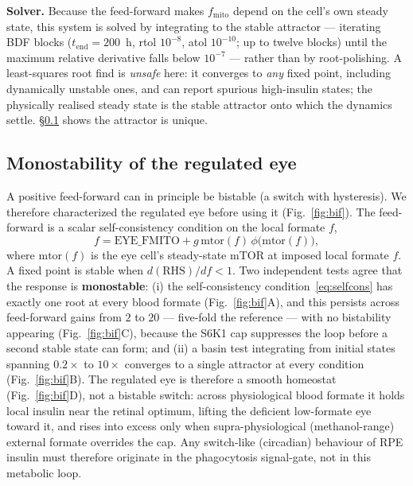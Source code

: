 \documentclass[11pt]{article}
\begin{document}
\textbf{Solver.} Because the feed-forward makes $f_{\mathrm{mito}}$ depend on the
cell's own steady state, this system is solved by integrating to the stable
attractor --- iterating BDF blocks ($t_{\mathrm{end}}=200$~h, rtol $10^{-8}$, atol
$10^{-10}$; up to twelve blocks) until the maximum relative derivative falls below
$10^{-7}$ --- rather than by root-polishing. A least-squares root find is
\emph{unsafe} here: it converges to \emph{any} fixed point, including dynamically
unstable ones, and can report spurious high-insulin states; the physically
realised steady state is the stable attractor onto which the dynamics settle.
\S\ref{sec:bif} shows the attractor is unique.

\subsection{Monostability of the regulated eye}\label{sec:bif}
A positive feed-forward can in principle be bistable (a switch with hysteresis).
We therefore characterized the regulated eye before using it
(Fig.~\ref{fig:bif}). The feed-forward is a scalar self-consistency condition on
the local formate $f$,
\begin{equation}
f=\mathrm{EYE\_FMITO}+g\,\mathrm{mtor}(f)\,\phi\!\big(\mathrm{mtor}(f)\big),
\label{eq:selfcons}
\end{equation}
where $\mathrm{mtor}(f)$ is the eye cell's steady-state mTOR at imposed local
formate $f$. A fixed point is stable when $d(\text{RHS})/df<1$. Two independent
tests agree that the response is \textbf{monostable}: (i) the self-consistency
condition~\eqref{eq:selfcons} has exactly one root at every blood formate
(Fig.~\ref{fig:bif}A), and this persists across feed-forward gains from $2$ to $20$
--- five-fold the reference --- with no bistability appearing (Fig.~\ref{fig:bif}C),
because the S6K1 cap suppresses the loop before a second stable state can form; and
(ii) a basin test integrating from initial states spanning $0.2\times$ to
$10\times$ converges to a single attractor at every condition
(Fig.~\ref{fig:bif}B). The regulated eye is therefore a smooth homeostat
(Fig.~\ref{fig:bif}D), not a bistable switch: across physiological blood formate it
holds local insulin near the retinal optimum, lifting the deficient low-formate eye
toward it, and rises into excess only when supra-physiological (methanol-range)
external formate overrides the cap. Any switch-like (circadian) behaviour of RPE
insulin must therefore originate in the phagocytosis signal-gate, not in this
metabolic loop.
\end{document}
